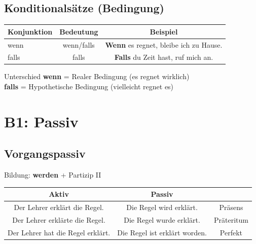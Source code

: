 
\section{Konditionalsätze (Bedingung)}
\label{sec:B1Konditional}

\begin{center}
\begin{tabular}{|l|c|c|}
\hline
Konjunktion & Bedeutung & Beispiel \\ \hline
wenn & wenn/falls & \textbf{Wenn} es regnet, bleibe ich zu Hause. \\ \hline
falls & falls & \textbf{Falls} du Zeit hast, ruf mich an. \\ \hline
\end{tabular}
\end{center}

\begin{infobox}{Unterschied}
\textbf{wenn} = Realer Bedingung (es regnet wirklich)\\
\textbf{falls} = Hypothetische Bedingung (vielleicht regnet es)
\end{infobox}

\chapterend

\chapter{B1: Passiv}
\label{cha:B1Passiv}

\section{Vorgangspassiv}
\label{sec:B1Vorgangspassiv}

Bildung: \textbf{werden} + Partizip II

\begin{center}
\begin{tabular}{|c|c|c|}
\hline
Aktiv & Passiv & \\ \hline
Der Lehrer erklärt die Regel. & Die Regel wird erklärt. & Präsens \\ \hline
Der Lehrer erklärte die Regel. & Die Regel wurde erklärt. & Präteritum \\ \hline
Der Lehrer hat die Regel erklärt. & Die Regel ist erklärt worden. & Perfekt \\ \hline
\end{tabular}
\end{center}

